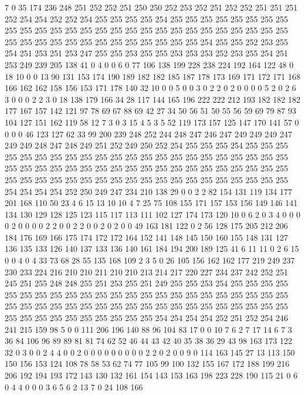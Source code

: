 7 0 35 174 236 248 251 252 252 251 250 250 252 253 252 251 252 252 251 251
251 252 254 254 252 252 254 255 255 255 255 254 255 255 255 255 255 255 255 255
255 255 255 255 255 255 255 255 255 255 255 255 255 255 255 255 255 255 255 255
255 255 255 255 255 255 255 255 255 255 255 255 254 255 255 252 253 255 254 251
253 251 253 247 255 255 253 255 255 253 253 253 252 253 255 254 251 253 249 239
205 138 41 0 4 0 0 6 0 77 106 138 199 228 238 224 192 164 122 48
0 18 10 0 0 13 90 131 153 174 190 189 182 182 185 187 178 173 169 171
172 171 168 166 162 162 158 156 153 171 178 140 32 10 0 0 5 0 0 3
0 2 2 0 2 0 0 0 0 5 2 0 2 6 3 0 0 0 2 2
3 0 18 138 179 166 34 28 117 144 165 196 222 222 212 193 182 182 182 177
167 157 142 121 97 78 69 67 88 69 42 27 34 50 56 51 50 55 56 59
69 79 87 93 104 127 151 162 119 58 12 7 3 0 3 15 4 5 3 5
52 119 173 157 125 147 170 141 57 0 0 0 0 46 123 127 62 33 99 200
239 248 252 244 248 247 246 247 249 249 249 247 249 249 248 247 248 249 251 252
249 250 252 254 255 255 255 254 255 255 255 255 255 255 255 255 255 255 255 255
255 255 255 255 255 255 255 255 255 255 255 255 255 255 255 255 255 255 255 255
255 255 255 255 255 255 255 255 255 255 255 255 255 255 255 255 255 255 255 255
255 255 255 255 255 255 255 255 254 254 254 254 252 250 249 247 234 210 138 29
0 0 2 2 82 154 131 119 134 177 201 168 110 50 23 4 6 15 13 10
10 4 7 25 75 108 155 171 157 153 156 149 146 141 134 130 129 128 125 123
115 117 113 111 102 127 174 173 120 10 0 6 2 0 3 4 0 0 0 0
2 0 0 0 0 2 2 0 0 2 2 0 0 2 0 2 0 0 49 163
181 122 0 2 56 128 175 205 212 206 184 176 169 166 175 174 172 172 164 152
141 148 145 150 160 155 148 131 127 136 135 133 126 140 137 133 136 140 161 184
194 200 189 125 41 6 11 11 0 2 6 15 0 0 4 0 4 33 73 68
28 55 135 168 109 2 3 5 0 26 105 156 162 162 177 219 249 237 230 233
224 216 210 210 211 210 210 213 214 217 220 227 234 237 242 252 251 245 251 255
248 248 255 251 253 255 251 249 255 255 253 254 255 255 255 255 255 255 255 255
255 255 255 255 255 255 255 255 255 255 255 255 255 255 255 255 255 255 255 255
255 255 255 255 255 255 255 255 255 255 255 255 255 255 255 255 255 255 255 255
255 255 255 255 254 254 254 254 252 251 252 254 246 241 215 159 98 5 0 0
111 206 196 140 88 96 104 83 17 0 0 10 7 6 2 7 17 14 6 7
3 36 84 106 96 89 89 81 81 74 62 52 46 44 43 42 40 35 38 36
29 43 98 163 173 122 32 0 3 0 0 2 4 4 0 0 2 0 0 0
0 0 0 0 0 0 2 2 0 2 0 0 9 0 114 163 145 27 13 113
150 150 156 153 124 108 78 58 53 62 74 77 105 99 100 132 155 167 172 188
199 216 206 192 194 193 172 143 130 132 161 154 143 153 163 198 223 228 190 115
21 0 6 0 4 4 0 0 0 3 6 5 6 2 13 7 0 24 108 166
